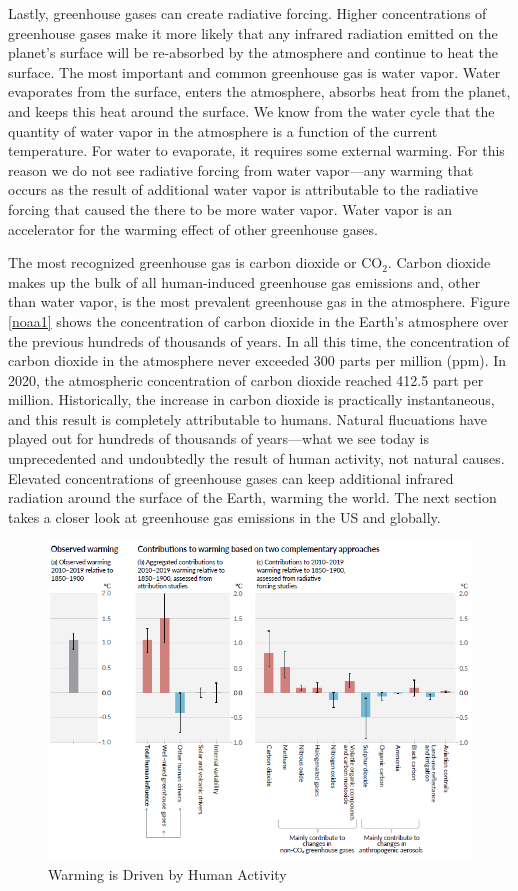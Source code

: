 Lastly, greenhouse gases can create radiative forcing. Higher concentrations of greenhouse gases make it more likely that any infrared radiation emitted on the planet's surface will be re-absorbed by the atmosphere and continue to heat the surface. The most important and common greenhouse gas is water vapor. Water evaporates from the surface, enters the atmosphere, absorbs heat from the planet, and keeps this heat around the surface. We know from the water cycle that the quantity of water vapor in the atmosphere is a function of the current temperature. For water to evaporate, it requires some external warming. For this reason we do not see radiative forcing from water vapor---any warming that occurs as the result of additional water vapor is attributable to the radiative forcing that caused the there to be more water vapor. Water vapor is an accelerator for the warming effect of other greenhouse gases.

The most recognized greenhouse gas is carbon dioxide or CO$_2$. Carbon dioxide makes up the bulk of all human-induced greenhouse gas emissions and, other than water vapor, is the most prevalent greenhouse gas in the atmosphere. Figure \ref{noaa1} shows the concentration of carbon dioxide in the Earth's atmosphere over the previous hundreds of thousands of years. In all this time, the concentration of carbon dioxide in the atmosphere never exceeded 300 parts per million (ppm). In 2020, the atmospheric concentration of carbon dioxide reached 412.5 part per million. Historically, the increase in carbon dioxide is practically instantaneous, and this result is completely attributable to humans. Natural flucuations have played out for hundreds of thousands of years---what we see today is unprecedented and undoubtedly the result of human activity, not natural causes. Elevated concentrations of greenhouse gases can keep additional infrared radiation around the surface of the Earth, warming the world. The next section takes a closer look at greenhouse gas emissions in the US and globally. 

\begin{figure}
\centering
\caption{Warming is Driven by Human Activity \citep{ipcc1_summary}\label{ipcc2}}
\includegraphics[width=\textwidth]{figures/chapter1_figures/ipcc_fig2.png}
\end{figure}

